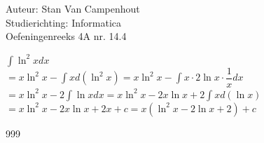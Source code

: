 \documentclass[a4paper]{article}
\begin{document}
  
\noindent \large Auteur: Stan Van Campenhout \\
\noindent \large Studierichting:  Informatica\\
\noindent \large Oefeningenreeks 4A nr. 14.4\\

\medskip

\normalsize

$ \displaystyle\int \ln^2x dx $\\

$ = x\ln^2x - \displaystyle\int x d\left(\ln^2x\right) = x\ln^2x - \displaystyle\int x \cdot 2\ln x \cdot \dfrac{1}{x} dx $\\

$ =  x\ln^2x - 2\displaystyle\int\ln x dx = x\ln^2x - 2x\ln x + 2\displaystyle\int x d\left(\ln x\right) $\\

$ =  x\ln^2x - 2x\ln x + 2x + c = x\left(\ln^2x - 2\ln x + 2\right) + c $\\

\begin{thebibliography}{999}
\end{thebibliography}
\end{document}
